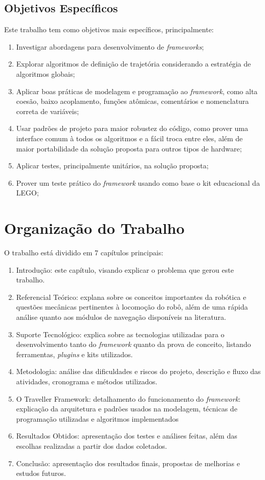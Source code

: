 \subsection{Objetivos Específicos}

Este trabalho tem como objetivos mais específicos, principalmente:
\begin{enumerate}
	\item Investigar abordagens para desenvolvimento de \textit{frameworks};
	\item Explorar algoritmos de definição de trajetória considerando a estratégia de algoritmos globais;
	\item Aplicar boas práticas de modelagem e programação ao \textit{framework}, como alta coesão, baixo acoplamento, funções atômicas, comentários e nomenclatura correta de variáveis;
	\item Usar padrões de projeto para maior robustez do código, como prover uma interface comum à todos os algoritmos e a fácil troca entre eles, além de maior portabilidade da solução proposta para outros tipos de hardware;
	\item Aplicar testes, principalmente unitários, na solução proposta;
	\item Prover um teste prático do \textit{framework} usando como base o kit educacional da LEGO;
\end{enumerate}

\section{Organização do Trabalho}

O trabalho está dividido em 7 capítulos principais:
\begin{enumerate}
	\item Introdução: este capítulo, visando explicar o problema que gerou este trabalho.
	\item Referencial Teórico: explana sobre os conceitos importantes da robótica e questões mecânicas pertinentes à locomoção do robô, além de uma rápida análise quanto aos módulos de navegação disponíveis na literatura.
	\item Suporte Tecnológico: explica sobre as tecnologias utilizadas para o desenvolvimento tanto do \textit{framework} quanto da prova de conceito, listando ferramentas, \textit{plugins} e kits utilizados.	
	\item Metodologia: análise das dificuldades e riscos do projeto, descrição e fluxo das atividades, cronograma e métodos utilizados.
	\item O Traveller Framework: detalhamento do funcionamento do \textit{framework}: explicação da arquitetura e padrões usados na modelagem, técnicas de programação utilizadas e algoritmos implementados
	\item Resultados Obtidos: apresentação dos testes e análises feitas, além das escolhas realizadas a partir dos dados coletados.	
	\item Conclusão: apresentação dos resultados finais, propostas de melhorias e estudos futuros.
\end{enumerate}
